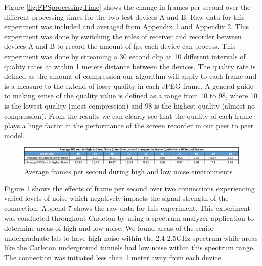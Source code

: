 \documentclass[a4paper,12pt]{article}
\begin{document}
Figure \ref{fig:FPSprocessingTime} shows the change in frames per second over the different processing times for the two test devices A and B. Raw data for this experiment was included and averaged from Appendix 1 and Appendix 2. This experiment was done by switching the roles of receiver and recorder between devices A and B to record the amount of fps each device can process. This experiment was done by streaming a 30 second clip at 10 different intervals of quality rates at within 1 meters distance between the devices. The quality rate is defined as the amount of compression our algorithm will apply to each frame and is a measure to the extend of lossy quality in each JPEG frame. A general guide to making sense of the quality value is defined as a range from 10 to 98, where 10 is the lowest quality (most compression) and 98 is the highest quality (almost no compression). From the results we can clearly see that the quality of each frame plays a huge factor in the performance of the screen recorder in our peer to peer model. 

\begin{figure}[h!]
\centering
\includegraphics[scale=.285]{Figures/Figure12.png}
\caption{Average frames per second during high and low noise environments}
\label{fig:FpsNoise}
\end{figure}

Figure \ref{fig:FpsNoise} shows the effects of frame per second over two connections experiencing varied levels of noise which negatively impacts the signal strength of the connection. Append 7 shows the raw data for this experiment. This experiment was conducted throughout Carleton by using a spectrum analyzer application to determine areas of high and low noise. We found areas of the senior undergraduate lab to have high noise within the 2.4-2.5GHz spectrum while areas like the Carleton underground tunnels had low noise within this spectrum range. The connection was initiated less than 1 meter away from each device.
\end{document}
